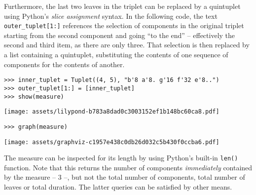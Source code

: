 \noindent Furthermore, the last two leaves in the triplet can be replaced by a
quintuplet using Python's \emph{slice assignment} syntax. In the following
code, the text \texttt{outer\_tuplet[1:]} references the selection of
components in the original triplet starting from the second component and going
\enquote{to the end} -- effectively the second and third item, as there are
only three. That selection is then replaced by a list containing a quintuplet,
substituting the contents of one sequence of components for the contents of
another.

\begin{comment}
<abjad>
inner_tuplet = Tuplet((4, 5), "b'8 a'8. g'16 f'32 e'8..")
outer_tuplet[1:] = [inner_tuplet]
show(measure)
</abjad>
\end{comment}

\begin{abjadbookoutput}
\begin{singlespacing}
\vspace{-0.5\baselineskip}
\begin{lstlisting}
>>> inner_tuplet = Tuplet((4, 5), "b'8 a'8. g'16 f'32 e'8..")
>>> outer_tuplet[1:] = [inner_tuplet]
>>> show(measure)
\end{lstlisting}
\noindent\texttt{[image: assets/lilypond-b783a8dad0c3003152ef1b148bc60ca8.pdf]}
\end{singlespacing}
\end{abjadbookoutput}

\begin{comment}
<abjad>
graph(measure)
</abjad>
\end{comment}

\begin{abjadbookoutput}
\begin{singlespacing}
\vspace{-0.5\baselineskip}
\begin{lstlisting}
>>> graph(measure)
\end{lstlisting}
\noindent\texttt{[image: assets/graphviz-c1957e438c0db26d032c5b430f0ccba6.pdf]}
\end{singlespacing}
\end{abjadbookoutput}

\noindent The measure can be inspected for its length by using Python's
built-in \texttt{len()} function. Note that this returns the number of
components \emph{immediately} contained by the measure -- 3 --, but not the
total number of components, total number of leaves or total duration. The
latter queries can be satisfied by other means.


